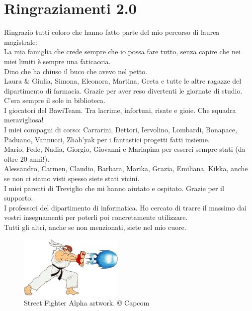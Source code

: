 %
%

\chapter*{Ringraziamenti 2.0}

Ringrazio tutti coloro che hanno fatto parte del mio percorso di laurea magistrale:\\
La mia famiglia che crede sempre che io possa fare tutto, senza capire che nei miei limiti è sempre una faticaccia.\\
Dino che ha chiuso il buco che avevo nel petto.\\
Laura \& Giulia, Simona, Eleonora, Martina, Greta e tutte le altre ragazze del dipartimento di farmacia. Grazie per aver reso divertenti le giornate di studio. C'era sempre il sole in biblioteca.\\
I giocatori del BawiTeam. Tra lacrime, infortuni, risate e gioie. Che squadra meravigliosa!\\
I miei compagni di corso: Carrarini, Dettori, Iervolino, Lombardi, Bonapace, Paduano, Vannucci, Zhab'yak per i fantastici progetti fatti insieme.\\
Mario, Fede, Nadia, Giorgio, Giovanni e Mariapina per esserci sempre stati (da oltre 20 anni!).\\
Alessandro, Carmen, Claudio, Barbara, Marika, Grazia, Emiliana, Kikka, anche se non ci siamo visti spesso siete stati vicini.\\
I miei parenti di Treviglio che mi hanno aiutato e ospitato. Grazie per il supporto.\\
I professori del dipartimento di informatica. Ho cercato di trarre il massimo dai vostri insegnamenti per poterli poi concretamente utilizzare.\\
Tutti gli altri, anche se non menzionati, siete nel mio cuore.

\vspace*{\fill}

\begin{figure}[H]
	\centering
	\includegraphics[width=5cm]{immagini/hadoken}
	\caption{Street Fighter Alpha artwork. © Capcom}
	\label{fig:hadoken}
\end{figure}
